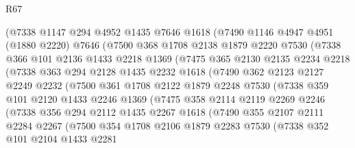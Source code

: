 \begin{lexlean}{R67}
\begin{coremodule}
        (@7338
          @1147
          @294
          @4952
          @1435
          @7646
          @1618
          (@7490
            @1146
            @4947
            @4951
            (@1880 @2220)
            @7646
            (@7500
              @368
              @1708
              @2138
              @1879
              @2220
              @7530
              (@7338
                @366
                @101
                @2136
                @1433
                @2218
                @1369
                (@7475
                  @365
                  @2130
                  @2135
                  @2234
                  @2218
                  (@7338
                    @363
                    @294
                    @2128
                    @1435
                    @2232
                    @1618
                    (@7490
                      @362
                      @2123
                      @2127
                      @2249
                      @2232
                      (@7500
                        @361
                        @1708
                        @2122
                        @1879
                        @2248
                        @7530
                        (@7338
                          @359
                          @101
                          @2120
                          @1433
                          @2246
                          @1369
                          (@7475
                            @358
                            @2114
                            @2119
                            @2269
                            @2246
                            (@7338
                              @356
                              @294
                              @2112
                              @1435
                              @2267
                              @1618
                              (@7490
                                @355
                                @2107
                                @2111
                                @2284
                                @2267
                                (@7500
                                  @354
                                  @1708
                                  @2106
                                  @1879
                                  @2283
                                  @7530
                                  (@7338
                                    @352
                                    @101
                                    @2104
                                    @1433
                                    @2281

\end{coremodule}
\end{lexlean}
